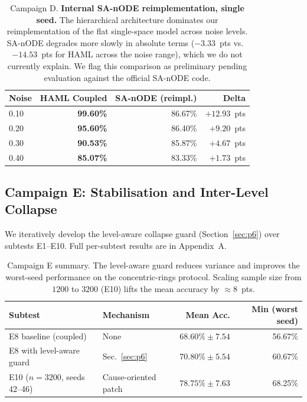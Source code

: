 \documentclass[11pt,a4paper]{article}
\begin{document}
\begin{table}[h]
\centering
\begin{tabular}{lrrr}
\toprule
\textbf{Noise} & \textbf{HAML Coupled} & \textbf{SA-nODE (reimpl.)} & \textbf{Delta} \\
\midrule
0.10 & \textbf{99.60\%} & 86.67\% & $+12.93$~pts \\
0.20 & \textbf{95.60\%} & 86.40\% & $+9.20$~pts \\
0.30 & \textbf{90.53\%} & 85.87\% & $+4.67$~pts \\
0.40 & \textbf{85.07\%} & 83.33\% & $+1.73$~pts \\
\bottomrule
\end{tabular}
\caption{Campaign D. \textbf{Internal SA-nODE reimplementation, single seed.} The
hierarchical architecture dominates our reimplementation of the flat single-space model
across noise levels. SA-nODE degrades more slowly in absolute terms ($-3.33$~pts vs.\
$-14.53$~pts for HAML across the noise range), which we do not currently explain. We
flag this comparison as preliminary pending evaluation against the official SA-nODE code.}
\label{tab:campaign_d}
\end{table}

\subsection{Campaign E: Stabilisation and Inter-Level Collapse}

We iteratively develop the level-aware collapse guard (Section~\ref{sec:p6}) over
subtests E1--E10. Full per-subtest results are in Appendix~A.

\begin{table}[h]
\centering
\small
\begin{tabular}{llrr}
\toprule
\textbf{Subtest} & \textbf{Mechanism} & \textbf{Mean Acc.} & \textbf{Min (worst seed)} \\
\midrule
E8 baseline (coupled)        & None                       & $68.60\% \pm 7.54$ & 56.67\% \\
E8 with level-aware guard    & Sec.~\ref{sec:p6}          & $70.80\% \pm 5.54$ & 60.67\% \\
\midrule
E10 ($n=3200$, seeds 42--46) & Cause-oriented patch       & $78.75\% \pm 7.63$ & 68.25\% \\
\bottomrule
\end{tabular}
\caption{Campaign E summary. The level-aware guard reduces variance and improves the
worst-seed performance on the concentric-rings protocol. Scaling sample size from $1200$
to $3200$ (E10) lifts the mean accuracy by $\approx 8$~pts.}
\label{tab:campaign_e}
\end{table}
\end{document}
